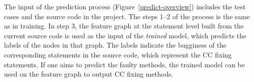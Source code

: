 The input of the prediction process (Figure~\ref{predict-overview})
includes the test cases and the source code in the project. The steps
1--2 of the process is the same as in training. In step 3, the feature
graph at the statement level built from the current source code is
used as the input of the {\em trained}  model, which
predicts the labels of the nodes in that graph. The labels indicate
the bugginess of the corresponding statements in the source
code, which represent the CC fixing statements. If one aims to predict
the faulty methods, the trained  model can be used on the
feature graph to output CC fixing methods.

